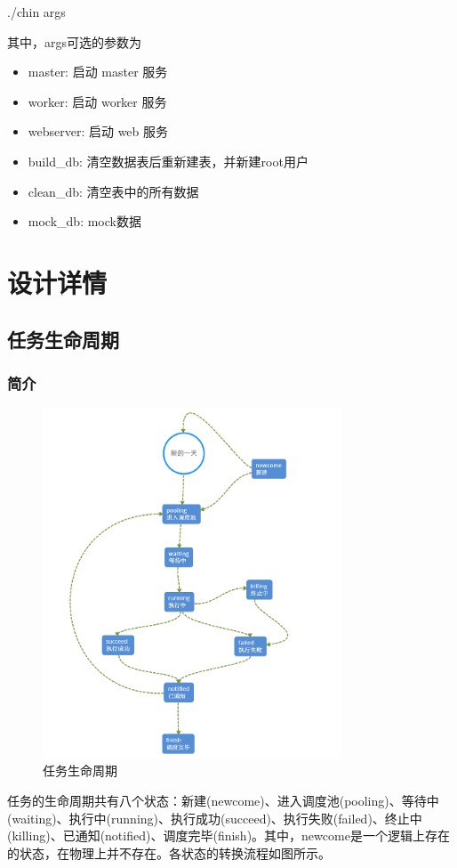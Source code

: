 ﻿\documentclass[a4paper]{report}
\begin{document}
./chin args

其中，args可选的参数为
\begin{itemize}
	\item master: 启动 master 服务
	\item worker: 启动 worker 服务
	\item webserver: 启动 web 服务
	\item build\_db: 清空数据表后重新建表，并新建root用户
	\item clean\_db: 清空表中的所有数据
	\item mock\_db: mock数据
\end{itemize}



\chapter{设计详情} %


\section{任务生命周期} %
\subsection{简介} %
\begin{figure}[htbp]
\centering\includegraphics[width=3.5in]{生命周期.png}
\caption{任务生命周期}
\end{figure}
任务的生命周期共有八个状态：新建(newcome)、进入调度池(pooling)、等待中(waiting)、执行中(running)、执行成功(succeed)、执行失败(failed)、终止中(killing)、已通知(notified)、调度完毕(finish)。其中，newcome是一个逻辑上存在的状态，在物理上并不存在。各状态的转换流程如图所示。
\end{document}
